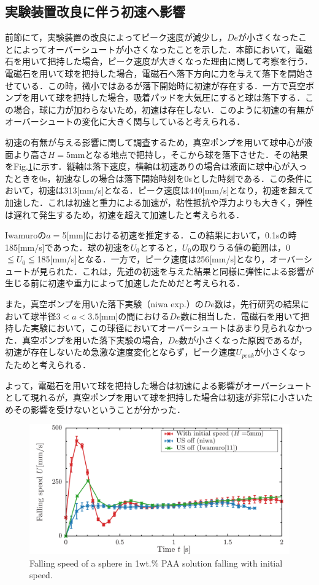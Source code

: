 \clearpage

\subsection{実験装置改良に伴う初速へ影響}

前節にて，実験装置の改良によってピーク速度が減少し，$De$が小さくなったことによってオーバーシュートが小さくなったことを示した．本節において，電磁石を用いて把持した場合，ピーク速度が大きくなった理由に関して考察を行う．電磁石を用いて球を把持した場合，電磁石へ落下方向に力を与えて落下を開始させている．この時，微小ではあるが落下開始時に初速が存在する．一方で真空ポンプを用いて球を把持した場合，吸着パッドを大気圧にすると球は落下する．この場合，球に力が加わらないため，初速は存在しない．このように初速の有無がオーバーシュートの変化に大きく関与していると考えられる．

初速の有無が与える影響に関して調査するため，真空ポンプを用いて球中心が液面より高さ$H=$5mmとなる地点で把持し，そこから球を落下させた．その結果をFig.\ref{fig:h-5}に示す．縦軸は落下速度，横軸は初速ありの場合は液面に球中心が入ったときを0s，初速なしの場合は落下開始時刻を0sとした時刻である．この条件において，初速は313[mm/s]となる．ピーク速度は440[mm/s]となり，初速を超えて加速した．これは初速と重力による加速が，粘性抵抗や浮力よりも大きく，弾性は遅れて発生するため，初速を超えて加速したと考えられる．

Iwamuro\cite{ref:9}の$a =$5[mm]における初速を推定する．この結果において，0.1sの時185[mm/s]であった．球の初速を$U_0$とすると，$U_0$の取りうる値の範囲は，0$\leqq U_0 \leqq$185[mm/s]となる．一方で，ピーク速度は256[mm/s]となり，オーバーシュートが見られた．これは，先述の初速を与えた結果と同様に弾性による影響が生じる前に初速や重力によって加速したためだと考えられる．

また，真空ポンプを用いた落下実験（niwa exp.）の$De$数は，先行研究の結果において球半径$3<a<3.5$[mm]の間における$De$数に相当した．電磁石を用いて把持した実験において，この球径においてオーバーシュートはあまり見られなかった．真空ポンプを用いた落下実験の場合，$De$数が小さくなった原因であるが，初速が存在しないため急激な速度変化とならず，ピーク速度$U_{peak}$が小さくなったためと考えられる．

よって，電磁石を用いて球を把持した場合は初速による影響がオーバーシュートとして現れるが，真空ポンプを用いて球を把持した場合は初速が非常に小さいためその影響を受けないということが分かった．

\begin{figure}[ht]
    \begin{center}
        \includegraphics[width=15cm,clip]{5-Results/h-5.png}
        \caption{Falling speed of a sphere in 1wt.\% PAA solution falling with initial speed.}
        \label{fig:h-5}
    \end{center}
\end{figure}